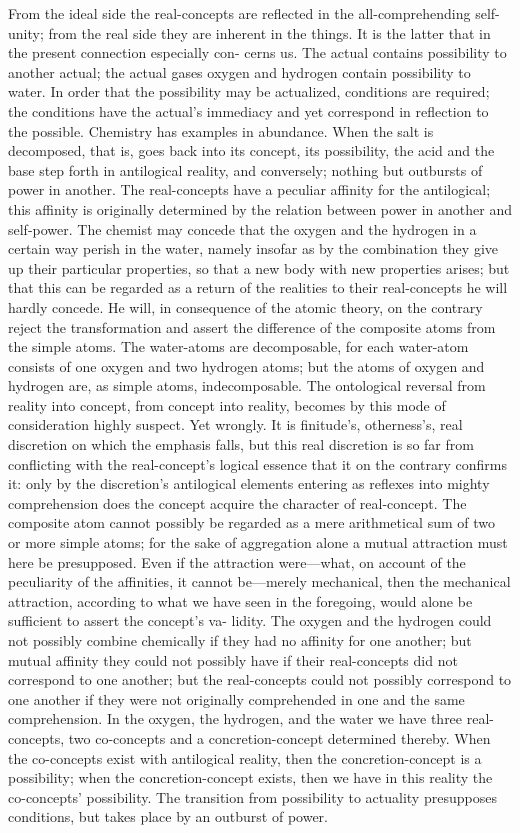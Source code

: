 \documentclass[12pt]{article}
\begin{document}
From the ideal side the real-concepts are reflected in the all-comprehending
self-unity; from the real side they are inherent in the things. It is the
latter that in the present connection especially con-
cerns us. The actual contains possibility to another actual; the actual
gases oxygen and hydrogen contain possibility to water. In order that the
possibility may be actualized, conditions are required; the conditions have
the actual's immediacy and yet correspond in reflection to the possible.
Chemistry has examples in abundance. When the salt is decomposed, that is,
goes back into its concept, its possibility, the acid and the base step
forth in antilogical reality, and conversely; nothing but outbursts of power
in another. The real-concepts have a peculiar affinity for the antilogical;
this affinity is originally determined by the relation between power in
another and self-power. The chemist may concede that the oxygen and the
hydrogen in a certain way perish in the water, namely insofar as by the
combination they give up their particular properties, so that a new body
with new properties arises; but that this can be regarded as a return of the
realities to their real-concepts he will hardly concede. He will, in
consequence of the atomic theory, on the contrary reject the transformation
and assert the difference of the composite atoms from the simple atoms. The
water-atoms are decomposable, for each water-atom consists of one oxygen and
two hydrogen atoms; but the atoms of oxygen and hydrogen are, as simple
atoms, indecomposable. The ontological reversal from reality into concept,
from concept into reality, becomes by this mode of consideration highly
suspect. Yet wrongly. It is finitude's, otherness's, real discretion on
which the emphasis falls, but this real discretion is so far from conflicting
with the real-concept's logical essence that it on the contrary confirms it:
only by the discretion's antilogical elements entering as reflexes into
mighty comprehension does the concept acquire the character of real-concept.
The composite atom cannot possibly be regarded as a mere arithmetical sum of
two or more simple atoms; for the sake of aggregation alone a mutual
attraction must here be presupposed. Even if the attraction were—what, on
account of the peculiarity of the affinities, it cannot be—merely
mechanical, then the mechanical attraction, according to what we have seen
in the foregoing, would alone be sufficient to assert the concept's va-
lidity. The oxygen and the hydrogen could not possibly combine chemically if
they had no affinity for one another; but mutual affinity they could not
possibly have if their real-concepts did not correspond to one another; but
the real-concepts could not possibly correspond to one another if they were
not originally comprehended in one and the same comprehension. In the
oxygen, the hydrogen, and the water we have three real-concepts, two
co-concepts and a concretion-concept determined thereby. When the
co-concepts exist with antilogical reality, then the concretion-concept is a
possibility; when the concretion-concept exists, then we have in this
reality the co-concepts' possibility. The transition from possibility to
actuality presupposes conditions, but takes place by an outburst of power.
\end{document}

